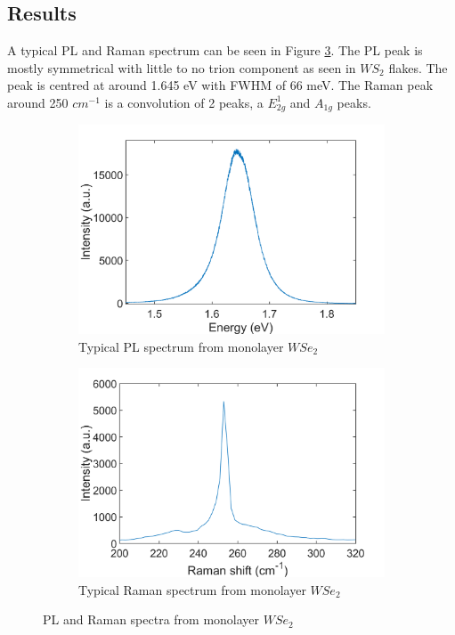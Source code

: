 	\subsection{Results}
	
	A typical PL and Raman spectrum can be seen in Figure \ref{fig:WSe2PLRamanSpectra}. The PL peak is mostly symmetrical with little to no trion component as seen in $WS_2$ flakes. The peak is centred at around 1.645 eV with FWHM of 66 meV. The Raman peak around 250 $cm^{-1}$ is a convolution of 2 peaks, a $E^1_{2g}$ and $A_{1g}$ peaks.  
	
\begin{figure}[!h]
	\begin{center}
		\begin{subfigure}[b]{0.4\textwidth}
			\includegraphics[scale=0.2]{WSe2/PLSpectrum.png}
			\caption{Typical PL spectrum from monolayer $WSe_2$}
			\label{fig:WSe2PLSpectrum}
		\end{subfigure}
		\qquad
		\begin{subfigure}[b]{0.4\textwidth}
			\includegraphics[scale=0.2]{WSe2/RamanSpectrum.png}
			\caption{Typical Raman spectrum from monolayer $WSe_2$}
			\label{fig:WSe2RamanSpectrum}
		\end{subfigure}
		\caption{PL and Raman spectra from monolayer $WSe_2$}
		\label{fig:WSe2PLRamanSpectra}
	\end{center}
\end{figure}
	
